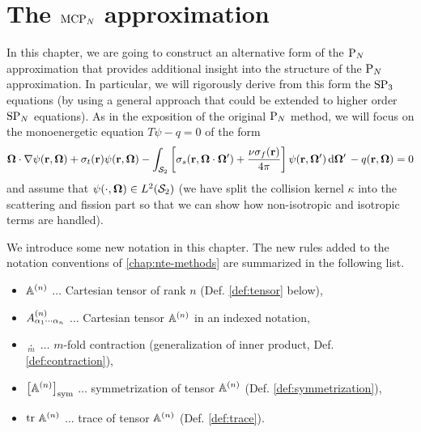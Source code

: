 \ifpdf
	\graphicspath{{4/pic/PNG/}{4/pic/PDF/}{4/pic/}}
\else
	\graphicspath{{4/pic/EPS/}{4/pic/}}
\fi

\chapter{The $\MCPN$ approximation}\label{chap:mcpn}

In this chapter, we are going to construct an alternative form of the $\PN$ approximation that provides additional
insight into the structure of the $\PN$ approximation. In particular, we will rigorously derive from this form
the $\SPN[3]$ equations (by using a general approach that could be extended to higher order $\SPN$ equations). As in
the exposition of the original $\PN$ method, we will focus on the monoenergetic equation $T\psi - q = 0$ of the form
\begin{equation}\label{eq:MC-bte}
    \bomega\cdot\nabla\psi(\br,\bomega) + \sigma_t(\br)\psi(\br,\bomega) - \intA[']{\left[\sigma_s(\br,\bomega\cdot\bomega') + 
    \frac{\nu\sigma_f(\br)}{4\pi}\right]\psi(\br,\bomega')} - q(\br,\bomega) = 0
\end{equation}
and assume that \mbox{$\psi(\cdot,\bomega)\in\Lp[2](\Sphere)$} (we have split the collision kernel $\kappa$ into the
scattering and fission part so that we can show how non-isotropic and isotropic terms are handled).

We introduce some new notation in this chapter. The new rules added to the notation conventions of
\cref{chap:nte-methods} are summarized in the following list.

\begin{itemize}
    \item $\AA$ $\ldots$ Cartesian tensor of rank $n$ (Def. \ref{def:tensor} below),
  	\item $\AAA{\alpha_1\cdots\alpha_n}$ $\ldots$ Cartesian tensor $\AA$ in an indexed notation,
    \item $\underset{m}{\cdot}$ $\ldots$ $m$-fold contraction (generalization of inner product, Def.
    \ref{def:contraction}),
    \item $\Sym{\AA}$ $\ldots$ symmetrization of tensor $\AA$ (Def. \ref{def:symmetrization}),
    \item $\trace \AA$ $\ldots$ trace of tensor $\AA$ (Def. \ref{def:trace}).
\end{itemize}

